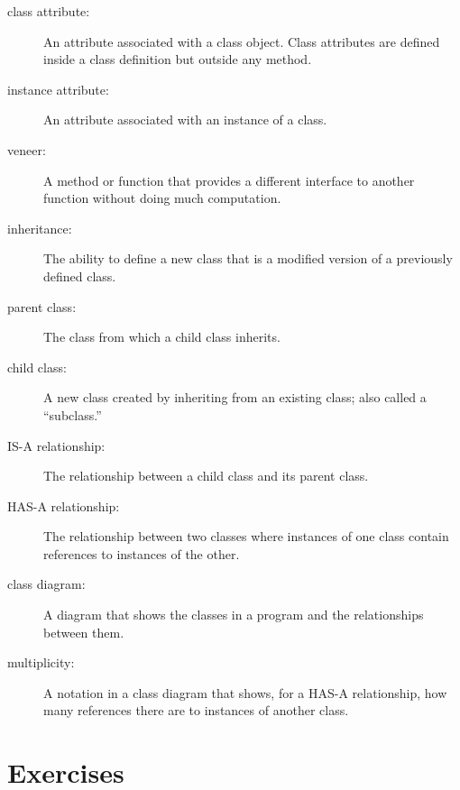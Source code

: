\documentclass[10pt]{book}
\begin{document}
\begin{CJK}{UTF8}{gbsn}
\begin{description}
\item[class attribute:] An attribute associated with a class
object.  Class attributes are defined inside
a class definition but outside any method.

\item[instance attribute:] An attribute associated with an
instance of a class.

\item[veneer:] A method or function that provides a different
interface to another function without doing much computation.

\item[inheritance:] The ability to define a new class that is a
modified version of a previously defined class.

\item[parent class:] The class from which a child class inherits.

\item[child class:] A new class created by inheriting from an
existing class; also called a ``subclass.''

\item[IS-A relationship:] The relationship between a child class
and its parent class.

\item[HAS-A relationship:] The relationship between two classes
where instances of one class contain references to instances of
the other.

\item[class diagram:] A diagram that shows the classes in a program
and the relationships between them.

\item[multiplicity:] A notation in a class diagram that shows, for
a HAS-A relationship, how many references there are to instances
of another class.

\end{description}


\section{Exercises}

\begin{exercise}
\label{poker}


\end{exercise}
\end{CJK}
\end{document}
